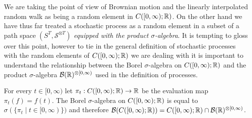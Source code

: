 We are taking the point of view of Brownian motion and the linearly
interpolated random walk as being a random element in $C([0,\infty) ;
\mathbb{R})$.  On the other hand we have thus far treated a stochastic
process as a random element in a subset of a path space $(S^T,
\mathcal{S}^{\otimes T})$ \emph{equipped with the product
  $\sigma$-algebra}.  It is tempting to gloss over this
point, however to tie in the general definition of stochastic
processes with the random elements of $C([0,\infty); \mathbb{R})$ we are
dealing with it is
important to understand the relationship between the Borel
$\sigma$-algebra on $C([0,\infty); \mathbb{R})$ and the product
$\sigma$-algebra $\mathcal{B}(\mathbb{R})^{\otimes [0,\infty)}$ used in the definition of
processes.
\begin{lem}\label{BorelGeneratedByProjections}For every $t \in [0,\infty)$ let $\pi_t : C([0,\infty); \mathbb{R}) \to
  \mathbb{R}$ be the evaluation map $\pi_t(f) = f(t)$.  The Borel $\sigma$-algebra on $C([0,\infty); \mathbb{R})$ is
  equal to $\sigma(\lbrace \pi_t \mid t \in [0,\infty) \rbrace)$ and
  therefore $\mathcal{B}(C([0,\infty); \mathbb{R})) = C([0,\infty);
  \mathbb{R}) \cap \mathcal{B}(\mathbb{R})^{\otimes [0,\infty)}$.
\end{lem}
